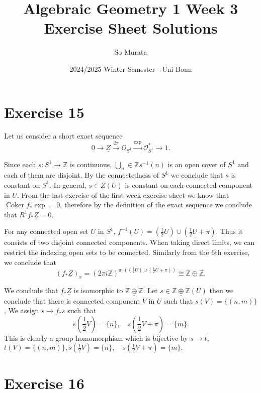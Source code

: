 \documentclass{article}
\title{Algebraic Geometry 1 Week 3 Exercise Sheet Solutions}
\author{So Murata}
\date{2024/2025 Winter Semester - Uni Bonn}
\DeclareMathOperator{\Coker}{Coker}
\begin{document}
\maketitle

\section*{Exercise 15}

Let us consider a short exact sequence
\begin{equation*}
0\to\underline{Z}\overset{2\pi}{\to}\mathcal{O}_{S^1}\overset{\exp}{\to}\mathcal{O}^*_{S^1}\to1.
\end{equation*}

Since each $s:S^1\to\mathbb{Z}$ is continuous, $\bigcup_{n}\in\mathbb{Z}s^{-1}(n)$ is an open cover of $S^1$ and each of them are disjoint. By the connectedness of $S^1$ we conclude that $s$ is constant on $S^1$. In general, $s\in\underline{Z}(U)$ is constant on each connected component in $U$. From the last exercise of the first week exercise sheet we know that $\Coker f_*\exp=0$, therefore by the definition of the exact sequence we conclude that $R^1f_*\underline{Z}=0$.  

For any connected open set $U$ in $S^1$, $f^{-1}(U) = \left({\frac 1 2}U\right)\cup\left({\frac 1 2}U+\pi\right)$. Thus it consists of two disjoint connected components. When taking direct limits, we can restrict the indexing open sets to be connected. Similarly from the 6th exercise, we conclude that 
\begin{equation*}
(f_*\underline{Z})_x = (2\pi i\mathbb{Z})^{\pi_0(\left({\frac 1 2}U\right)\cup\left({\frac 1 2}U+\pi\right))} \cong \mathbb{Z}\oplus\mathbb{Z}.
\end{equation*}

We conclude that $f_*\underline{Z}$ is isomorphic to $\underline{\mathbb{Z}\oplus\mathbb{Z}}$. Let $s\in\underline{\mathbb{Z}\oplus\mathbb{Z}}(U)$ then we conclude that there is connected component $V$ in $U$ such that $s(V)=\{(n,m)\}$, We assign $s\to f_*s$ such that
\begin{equation*}
s({\frac 1 2}V) = \{n\},\quad s({\frac 1 2}V+\pi) = \{m\}.
\end{equation*}
This is clearly a group homomorphism which is bijective by $s\to t$, $t(V) = \{(n,m)\}, s({\frac 1 2}V) = \{n\},\quad s({\frac 1 2}V+\pi) = \{m\}.$
\section*{Exercise 16}
\end{document}
